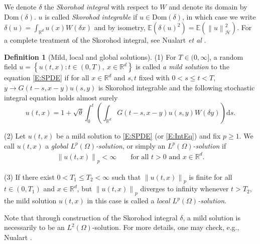 \documentclass[12pt]{report}
\theoremstyle{plain}
\theoremstyle{definition}
\newtheorem{definition}[theorem]{Definition}
\numberwithin{equation}{section}
\newcommand{\R}{\mathbb{R}}
\newcommand{\E}{\mathbb{E}}
\newcommand{\Norm}[1]{\left\|  #1   \right\|}
\newcommand{\ud}{\ensuremath{ \mathrm{d} }}
\begin{document}
We denote $\delta$ the {\it Skorohod integral} with respect to $W$ and denote its domain by
$\text{Dom}(\delta)$. $u$ is called {\it Skorohod integrable} if $u\in \text{Dom}(\delta)$, in which
case we write $\delta(u) = \int_{\R^d} u(x) W(\delta x)$ and by isometry,
$\E\left(\delta(u)^2\right)=\E(\Norm{u}_{\mathcal{H}}^2)$. For a complete treatment of the Skorohod
integral, see Nualart {\it et al} \cite{nualart.nualart:18:introduction}.

\begin{definition}[Mild, local and global solutions] \label{D:Sol}
	(1) For $T\in (0,\infty]$, a random field $u=\left\{u(t,x) : t \in (0,T),\: x\in\R^d\right\}$ is
	called {\it a mild solution} to the equation \eqref{E:SPDE} if for all $x\in\R^d$ and $s,t$ fixed
	with $0<s\le t <T$, $y\to G(t-s,x-y)u(s,y)$ is Skorohod integrable and the following stochastic
	integral equation holds almost surely
	\begin{equation} \label{E:IntEq}
	u(t,x) = 1 + \sqrt{\theta}\int_0^t \left( \int_{\R^d} G(t-s,x-y)u(s,y) W(\delta y) \right)\ud s.
	\end{equation}
	
	\noindent (2) Let $u(t,x)$ be a mild solution to \eqref{E:SPDE} (or \eqref{E:IntEq}) and fix $p\ge
	1$. We call $u(t,x)$ a {\it global $L^p(\Omega)$-solution}, or simply an {\it
		$L^p(\Omega)$-solution} if
	\begin{align} \label{E:Lp}
	\Norm{u(t,x)}_p < \infty \qquad \text{for all $t>0$ and $x \in \R^d$.}
	\end{align}
	
	\noindent (3) If there exist $0<T_1\le T_2<\infty$ such that $\Norm{u(t,x)}_p$ is finite for all
	$t\in(0,T_1)$ and $x\in\R^d$, but $\Norm{u(t,x)}_p$ diverges to infinity whenever $t>T_2$, the mild
	solution $u(t,x)$ in this case is called a {\it local $L^p(\Omega)$-solution}.
\end{definition}

Note that through construction of the Skorohod integral $\delta$, a mild solution is necessarily to
be an $L^2(\Omega)$-solution.  For more details, one may check, e.g., Nualart \cite[Chapter
3]{nualart.nualart:18:introduction}.  \bigskip

\end{document}
